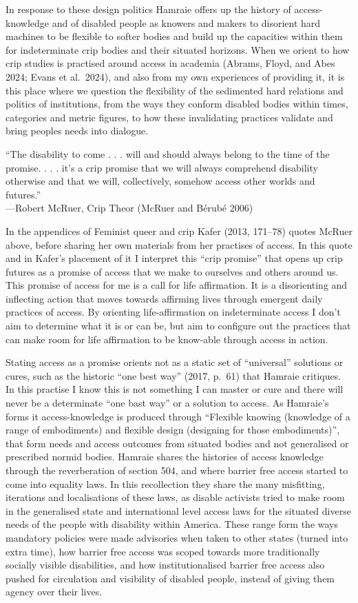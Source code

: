 In response to these design politics Hamraie offers up the history of
access-knowledge and of disabled people as knowers and makers to
disorient hard machines to be flexible to softer bodies and build up the
capacities within them for indeterminate crip bodies and their situated
horizons. When we orient to how crip studies is practised around access
in academia (Abrams, Floyd, and Abes 2024; Evans et al.~2024), and also
from my own experiences of providing it, it is this place where we
question the flexibility of the sedimented hard relations and politics
of institutions, from the ways they conform disabled bodies within
times, categories and metric figures, to how these invalidating
practices validate and bring peoples needs into dialogue.

``The disability to come . . . will and should always belong to the time
of the promise. . . . it's a crip promise that we will always comprehend
disability otherwise and that we will, collectively, somehow access
other worlds and futures.''\\
---Robert McRuer, Crip Theor (McRuer and Bérubé 2006)

In the appendices of Feminist queer and crip Kafer (2013, 171--78)
quotes McRuer above, before sharing her own materials from her practises
of access. In this quote and in Kafer's placement of it I interpret this
``crip promise'' that opens up crip futures as a promise of access that
we make to ourselves and others around us. This promise of access for me
is a call for life affirmation. It is a disorienting and inflecting
action that moves towards affirming lives through emergent daily
practices of access. By orienting life-affirmation on indeterminate
access I don't aim to determine what it is or can be, but aim to
configure out the practices that can make room for life affirmation to
be know-able through access in action.

Stating access as a promise orients not as a static set of ``universal''
solutions or cures, such as the historic ``one best way'' (2017, p.~61)
that Hamraie critiques. In this practise I know this is not something I
can master or cure and there will never be a determinate ``one bast
way'' or a solution to access. As Hamraie's forms it access-knowledge is
produced through ``Flexible knowing (knowledge of a range of
embodiments) and flexible design (designing for those embodiments)'',
that form needs and access outcomes from situated bodies and not
generalised or prescribed normid bodies. Hamraie shares the histories of
access knowledge through the reverberation of section 504, and where
barrier free access started to come into equality laws. In this
recollection they share the many misfitting, iterations and
localisations of these laws, as disable activists tried to make room in
the generalised state and international level access laws for the
situated diverse needs of the people with disability within America.
These range form the ways mandatory policies were made advisories when
taken to other states (turned into extra time), how barrier free access
was scoped towards more traditionally socially visible disabilities, and
how institutionalised barrier free access also pushed for circulation
and visibility of disabled people, instead of giving them agency over
their lives.

